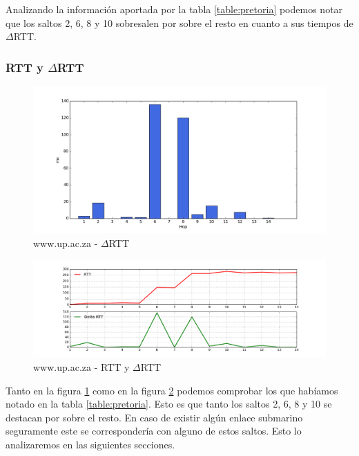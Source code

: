 Analizando la información aportada por la tabla \ref{table:pretoria} podemos notar que los saltos 2, 6, 8 y 10 sobresalen por sobre el resto en cuanto a sus tiempos de $\Delta$RTT. 

\subsubsection{RTT y $\Delta$RTT}

\begin{figure}[H]
    \begin{center}
        \includegraphics[width=1\textwidth]{data/rtt-pretoria-bar.png}
        \caption{www.up.ac.za - $\Delta$RTT}
        \label{histo:pretoria}
    \end{center}
\end{figure}

\begin{figure}[H]
    \begin{center}
        \includegraphics[width=1\textwidth]{data/rtt-pretoria-lines.png}
        \caption{www.up.ac.za - RTT y $\Delta$RTT}
        \label{lines:pretoria}
    \end{center}
\end{figure}

Tanto en la figura \ref{histo:pretoria} como en la figura \ref{lines:pretoria} podemos comprobar los que habíamos notado en la tabla \ref{table:pretoria}. Esto es que tanto los saltos 2, 6, 8 y 10 se destacan por sobre el resto. En caso de existir algún enlace submarino seguramente este se correspondería con alguno de estos saltos. Esto lo analizaremos en las siguientes secciones.


